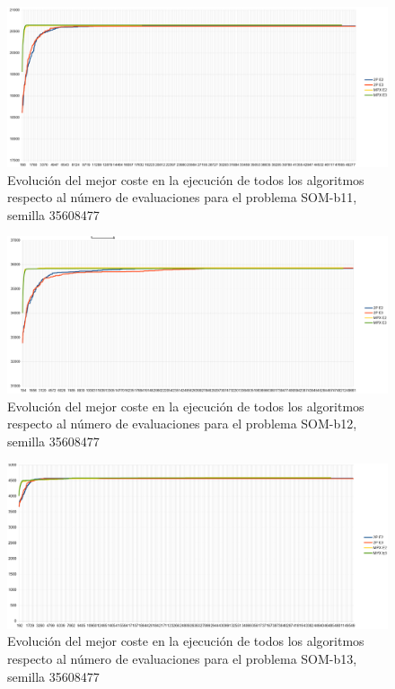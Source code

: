 	\begin{figure}[H]
		\centering
		\includegraphics[scale=0.3]{img/35608477_SOM-b_11_n300_m90.png}
		\caption{Evolución del mejor coste en la ejecución de todos los algoritmos respecto al número de evaluaciones para el problema SOM-b11, semilla 35608477}
		\label{SOM-b_11_historico}
	\end{figure}

	\begin{figure}[H]
		\centering
		\includegraphics[scale=0.3]{img/35608477_SOM-b_12_n300_m90.png}
		\caption{Evolución del mejor coste en la ejecución de todos los algoritmos respecto al número de evaluaciones para el problema SOM-b12, semilla 35608477}
		\label{SOM-b_12_historico}
	\end{figure}

	\begin{figure}[H]
		\centering
		\includegraphics[scale=0.3]{img/35608477_SOM-b_13_n300_m90.png}
		\caption{Evolución del mejor coste en la ejecución de todos los algoritmos respecto al número de evaluaciones para el problema SOM-b13, semilla 35608477}
		\label{SOM-b_13_historico}
	\end{figure}

